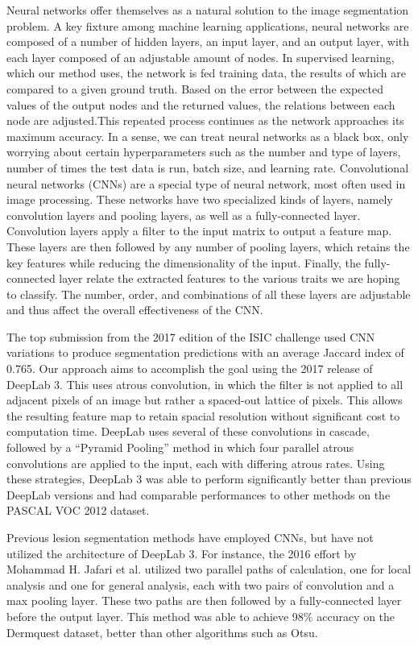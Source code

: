\documentclass[11pt, letterpaper]{article}
\begin{document}
Neural networks offer themselves as a natural solution to the image segmentation problem. A key fixture among machine learning applications, neural networks are composed of a number of hidden layers, an input layer, and an output layer, with each layer composed of an adjustable amount of nodes. In supervised learning, which our method uses, the network is fed training data, the results of which are compared to a given ground truth. Based on the error between the expected values of the output nodes and the returned values, the relations between each node are adjusted.This repeated process continues as the network approaches its maximum accuracy. In a sense, we can treat neural networks as a black box, only worrying about certain hyperparameters such as the number and type of layers, number of times the test data is run, batch size, and learning rate.
Convolutional neural networks (CNNs) are a special type of neural network, most often used in image processing. These networks have two specialized kinds of layers, namely convolution layers and pooling layers, as well as a fully-connected layer. Convolution layers apply a filter to the input matrix to output a feature map. These layers are then followed by any number of pooling layers, which retains the key features while reducing the dimensionality of the input. Finally, the fully-connected layer relate the extracted features to the various traits we are hoping to classify. The number, order, and combinations of all these layers are adjustable and thus affect the overall effectiveness of the CNN.

The top submission from the 2017 edition of the ISIC challenge used CNN variations to produce segmentation predictions with an average Jaccard index of 0.765. Our approach aims to accomplish the goal using the 2017 release of DeepLab 3. This uses atrous convolution, in which the filter is not applied to all adjacent pixels of an image but rather a spaced-out lattice of pixels. This allows the resulting feature map to retain spacial resolution without significant cost to computation time. DeepLab uses several of these convolutions in cascade, followed by a “Pyramid Pooling” method in which four parallel atrous convolutions are applied to the input, each with differing atrous rates. Using these strategies, DeepLab 3 was able to perform significantly better than previous DeepLab versions and had comparable performances to other methods on the PASCAL VOC 2012 dataset.

Previous lesion segmentation methods have employed CNNs, but have not utilized the architecture of DeepLab 3. For instance, the 2016 effort by Mohammad H. Jafari et al. utilized two parallel paths of calculation, one for local analysis and one for general analysis, each with two pairs of convolution and a max pooling layer. These two paths are then followed by a fully-connected layer before the output layer. This method was able to achieve 98\% accuracy on the Dermquest dataset, better than other algorithms such as Otsu.
\end{document}
